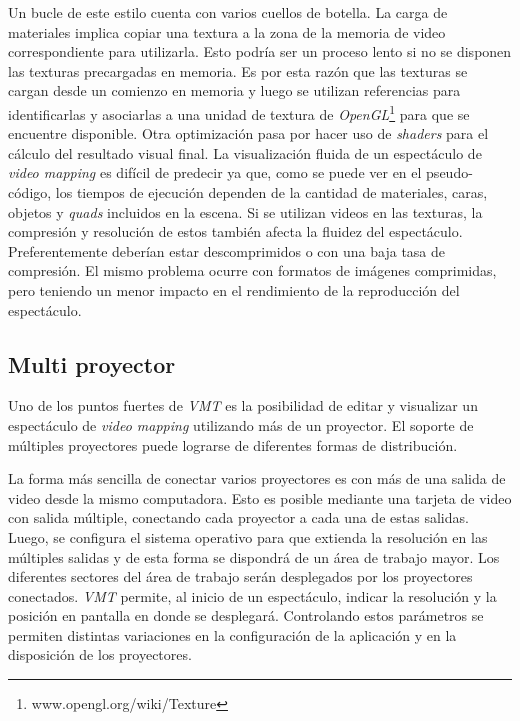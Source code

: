 Un bucle de este estilo cuenta con varios cuellos de botella.
La carga de materiales implica copiar una textura a la zona de la memoria de video correspondiente para utilizarla. Esto podría ser un proceso lento si no se disponen las texturas precargadas en memoria. Es por esta razón que las texturas se cargan desde un comienzo en memoria y luego se utilizan referencias para identificarlas y asociarlas a una unidad de textura de \emph{OpenGL}\footnote{www.opengl.org/wiki/Texture} para que se encuentre disponible.
Otra optimización pasa por hacer uso de \emph{shaders} para el cálculo del resultado visual final.
La visualización fluida de un espectáculo de \emph{video mapping} es difícil de predecir ya que, como se puede ver en el pseudo-código, los tiempos de ejecución dependen de la cantidad de materiales, caras, objetos y \emph{quads} incluidos en la escena.
Si se utilizan videos en las texturas, la compresión y resolución de estos también afecta la fluidez del espectáculo. Preferentemente deberían estar descomprimidos o con una baja tasa de compresión. El mismo problema ocurre con formatos de imágenes comprimidas, pero teniendo un menor impacto en el rendimiento de la reproducción del espectáculo.

\subsection{Multi proyector}

Uno de los puntos fuertes de \emph{VMT} es la posibilidad de editar y visualizar un espectáculo de \emph{video mapping} utilizando más de un proyector. El soporte de múltiples proyectores puede lograrse de diferentes formas de distribución.

La forma más sencilla de conectar varios proyectores es con más de una salida de video desde la mismo computadora. Esto es posible mediante una tarjeta de video con salida múltiple, conectando cada proyector a cada una de estas salidas. Luego, se configura el sistema operativo para que extienda la resolución en las múltiples salidas y de esta forma se dispondrá de un área de trabajo mayor. Los diferentes sectores del área de trabajo serán desplegados por los proyectores conectados.
\emph{VMT} permite, al inicio de un espectáculo, indicar la resolución y la posición en pantalla en donde se desplegará. Controlando estos parámetros se permiten distintas variaciones en la configuración de la aplicación y en la disposición de los proyectores.

